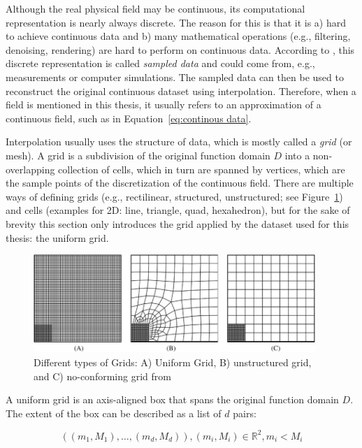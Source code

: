 Although the real physical field may be continuous, its computational representation is nearly always discrete. 
The reason for this is that it is a) hard to achieve continuous data and b) many mathematical operations (e.g., filtering, denoising, rendering) are hard to perform on continuous data. 
According to , this discrete representation is called \textit{sampled data} and could come from, e.g., measurements or computer simulations. 
The sampled data can then be used to reconstruct the original continuous dataset using interpolation. 
Therefore, when a field is mentioned in this thesis, it usually refers to an approximation of a continuous field, such as in Equation~\ref{eq:continous data}. 


Interpolation usually uses the structure of data, which is mostly called a \textit{grid} (or mesh). 
A grid is a subdivision of the original function domain $D$ into a non\--overlapping collection of cells, which in turn are spanned by vertices, which are the sample points of the discretization of the continuous field.  
There are multiple ways of defining grids (e.g., rectilinear, structured, unstructured; see Figure~\ref{fig:grid types}) and cells (examples for 2D: line, triangle, quad, hexahedron), but for the sake of brevity this section only introduces the grid applied by the dataset used for this thesis: the uniform grid. 

\begin{figure}
  \includegraphics[width=0.95\textwidth]{figures/grid-types.png}
  \caption[Examples of Different Grid Types]{Different types of Grids: A) Uniform Grid, B) unstructured grid, and C) no-conforming grid from \cite{kaltenbacher_nonconforming_2022}}
  \label{fig:grid types}
\end{figure}


A uniform grid is an axis-aligned box that spans the original function domain $D$. 
The extent of the box can be described as a list of $d$ pairs:

\begin{equation}
  ((m_1, M_1),\dots,(m_d, M_d)), (m_i, M_i) \in \mathbb{R}^2, m_i < M_i
  \label{eq:uniform grid coordinates}
\end{equation}

